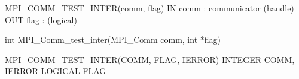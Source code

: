 MPI_COMM_TEST_INTER(comm, flag)
IN comm : communicator (handle)
OUT flag : (logical)

int MPI_Comm_test_inter(MPI_Comm comm, int *flag)

MPI_COMM_TEST_INTER(COMM, FLAG, IERROR)
INTEGER COMM, IERROR
LOGICAL FLAG

